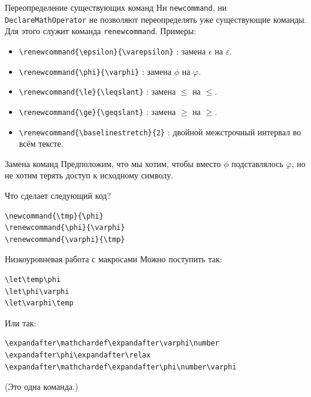 \documentclass[ mathserif]{beamer}
\begin{document}
%
%
%
\begin{frame}[fragile]{Переопределение существующих команд}
 Ни \texttt{newcommand}, ни \texttt{DeclareMathOperator} не позволяют переопределять уже существующие команды. Для этого служит команда 
\texttt{renewcommand}. Примеры:
\begin{itemize}
 \item \verb:\renewcommand{\epsilon}{\varepsilon}: : замена $\epsilon$ на $\varepsilon$.
 \item \verb:\renewcommand{\phi}{\varphi}: : замена $\phi$ на $\varphi$.
 \item \verb:\renewcommand{\le}{\leqslant}: : замена $\le$ на $\leqslant$.
 \item \verb:\renewcommand{\ge}{\geqslant}: : замена $\ge$ на $\geqslant$.
 \item \verb:\renewcommand{\baselinestretch}{2}: : двойной межстрочный интервал во всём тексте.
\end{itemize}
\end{frame}
\begin{frame}[fragile]{Замена команд}
 Предположим, что мы хотим, чтобы вместо $\phi$ подставлялось $\varphi$, но не хотим терять доступ к исходному символу.

Что сделает следующий код?

\begin{verbatim}
\newcommand{\tmp}{\phi}
\renewcommand{\phi}{\varphi}
\renewcommand{\varphi}{\tmp}
\end{verbatim}


\end{frame}
\begin{frame}[fragile]{Низкоуровневая работа с макросами}
 Можно поступить так:
\begin{verbatim}
\let\temp\phi
\let\phi\varphi
\let\varphi\temp
\end{verbatim}

Или так:
\begin{verbatim}
\expandafter\mathchardef\expandafter\varphi\number
\expandafter\phi\expandafter\relax
\expandafter\mathchardef\expandafter\phi\number\varphi
\end{verbatim}
(Это одна команда.)

\end{frame}
\end{document}
